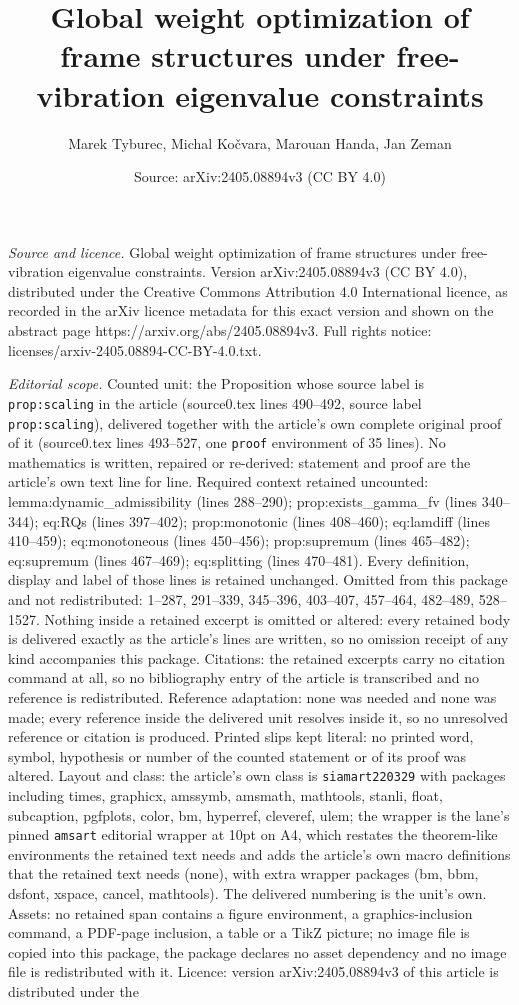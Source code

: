 \documentclass[10pt,a4paper]{amsart}
\title[Global weight optimization of frame structures under free-vi]{Global weight optimization of frame structures under free-vibration eigenvalue constraints}
\author{Marek Tyburec, Michal Ko\v{c}vara, Marouan Handa, Jan Zeman}
\date{Source: arXiv:2405.08894v3 (CC BY 4.0)}
\begin{document}
\maketitle

\noindent\emph{Source and licence.} Global weight optimization of frame structures under free-vibration eigenvalue constraints. Version arXiv:2405.08894v3 (CC BY 4.0), distributed under the Creative Commons Attribution 4.0 International licence, as recorded in the arXiv licence metadata for this exact version and shown on the abstract page https://arxiv.org/abs/2405.08894v3. Full rights notice: licenses/arxiv-2405.08894-CC-BY-4.0.txt.\par\smallskip

\noindent\textit{Editorial scope.} Counted unit: the Proposition whose source label is \texttt{prop:scaling} in the article (source0.tex lines 490--492, source label \texttt{prop:scaling}), delivered together with the article's own complete original proof of it (source0.tex lines 493--527, one \texttt{proof} environment of 35 lines). No mathematics is written, repaired or re-derived: statement and proof are the article's own text line for line. Required context retained uncounted: lemma:dynamic\_admissibility (lines 288--290); prop:exists\_gamma\_fv (lines 340--344); eq:RQs (lines 397--402); prop:monotonic (lines 408--460); eq:lamdiff (lines 410--459); eq:monotoneous (lines 450--456); prop:supremum (lines 465--482); eq:supremum (lines 467--469); eq:splitting (lines 470--481). Every definition, display and label of those lines is retained unchanged. Omitted from this package and not redistributed: 1--287, 291--339, 345--396, 403--407, 457--464, 482--489, 528--1527. Nothing inside a retained excerpt is omitted or altered: every retained body is delivered exactly as the article's lines are written, so no omission receipt of any kind accompanies this package. Citations: the retained excerpts carry no citation command at all, so no bibliography entry of the article is transcribed and no reference is redistributed. Reference adaptation: none was needed and none was made; every reference inside the delivered unit resolves inside it, so no unresolved reference or citation is produced. Printed slips kept literal: no printed word, symbol, hypothesis or number of the counted statement or of its proof was altered. Layout and class: the article's own class is \texttt{siamart220329} with packages including times, graphicx, amssymb, amsmath, mathtools, stanli, float, subcaption, pgfplots, color, bm, hyperref, cleveref, ulem; the wrapper is the lane's pinned \texttt{amsart} editorial wrapper at 10pt on A4, which restates the theorem-like environments the retained text needs and adds the article's own macro definitions that the retained text needs (none), with extra wrapper packages (bm, bbm, dsfont, xspace, cancel, mathtools). The delivered numbering is the unit's own. Assets: no retained span contains a figure environment, a graphics-inclusion command, a PDF-page inclusion, a table or a TikZ picture; no image file is copied into this package, the package declares no asset dependency and no image file is redistributed with it. Licence: version arXiv:2405.08894v3 of this article is distributed under the 
\end{document}
